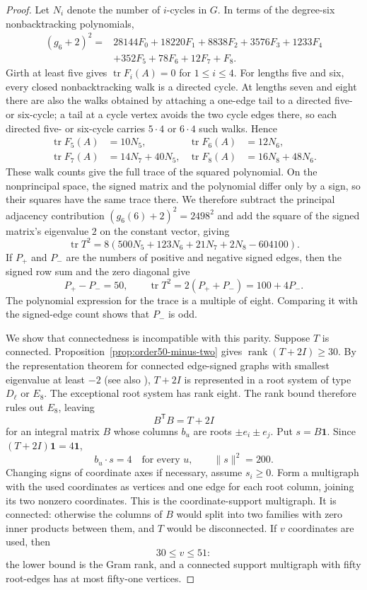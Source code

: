 \documentclass[a4paper,10pt,reqno]{amsart}
\theoremstyle{plain}
\theoremstyle{definition}
\theoremstyle{remark}
\newcommand{\one}{\mathbf 1}
\newcommand{\tr}{\operatorname{tr}}
\begin{document}
\begin{proof}
Let \(N_i\) denote the number of \(i\)-cycles in \(G\).  In terms of the degree-six
nonbacktracking polynomials,
\[
\begin{aligned}
(g_6+2)^2={}&28144F_0+18220F_1+8838F_2+3576F_3+1233F_4\\
&+352F_5+78F_6+12F_7+F_8.
\end{aligned}
\]
Girth at least five gives \(\tr F_i(A)=0\) for \(1\le i\le4\).  For
lengths five and six, every closed nonbacktracking walk is a directed cycle.
At lengths seven and eight there are also the walks obtained by attaching a
one-edge tail to a directed five- or six-cycle; a tail at a cycle vertex
avoids the two cycle edges there, so each directed five- or six-cycle
carries \(5\cdot4\) or \(6\cdot4\) such walks.  Hence
\[
\begin{aligned}
\tr F_5(A)&=10N_5,&
\tr F_6(A)&=12N_6,\\
\tr F_7(A)&=14N_7+40N_5,&
\tr F_8(A)&=16N_8+48N_6.
\end{aligned}
\]
These walk counts give the full trace of the squared polynomial.  On the
nonprincipal space, the signed matrix and the polynomial differ only by a
sign, so their squares have the same trace there.  We therefore subtract the
principal adjacency contribution \((g_6(6)+2)^2=2498^2\) and add the square
of the signed matrix's eigenvalue \(2\) on the constant vector, giving
\[
\tr T^2
=8(500N_5+123N_6+21N_7+2N_8-604100).
\]
If \(P_+\) and \(P_-\) are the numbers of positive and negative signed edges,
then the signed row sum and the zero diagonal give
\[
P_+-P_-=50,\qquad
\tr T^2=2(P_++P_-)=100+4P_-.
\]
The polynomial expression for the trace is a multiple of eight.
Comparing it with the signed-edge count shows that \(P_-\) is odd.

We show that connectedness is incompatible with this parity.  Suppose
\(T\) is connected.  Proposition~\ref{prop:order50-minus-two} gives
\(\operatorname{rank}(T+2I)\ge30\).  By the representation theorem for
connected edge-signed graphs with smallest eigenvalue at least \(-2\)
\cite[Theorem~2]{GreavesEtAl2015} (see also \cite{CameronEtAl1976}),
\(T+2I\) is represented in a root system of
type \(D_\ell\) or \(E_8\).  The exceptional root system has rank eight. The rank bound therefore
rules out \(E_8\), leaving
\[
B^{\mathsf T}B=T+2I
\]
for an integral matrix \(B\) whose columns \(b_u\) are roots
\(\pm e_i\pm e_j\).  Put \(s=B\one\).  Since
\((T+2I)\one=4\one\),
\[
b_u\mathbin{\cdot}s=4\quad\text{for every }u,
\qquad
\lVert s\rVert^2=200.
\]
Changing signs of coordinate axes if necessary, assume \(s_i\ge0\).
Form a multigraph with the used coordinates as vertices and one edge
for each root column, joining its two nonzero coordinates.
This is the coordinate-support multigraph.
It is connected: otherwise the columns of \(B\) would split into
two families with zero inner products between them, and \(T\)
would be disconnected.  If \(v\) coordinates are used, then
\[
30\le v\le51:
\]
the lower bound is the Gram rank, and a connected support multigraph with
fifty root-edges has at most fifty-one vertices.


\end{proof}
\end{document}
